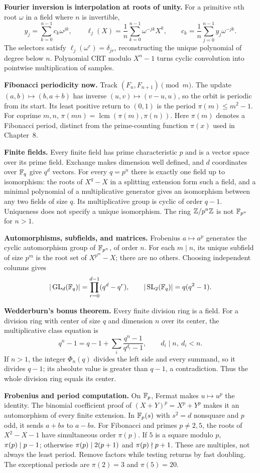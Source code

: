 \textbf{Fourier inversion is interpolation at roots of unity.}
For a primitive $n$th root $\omega$ in a field where $n$ is invertible,
\[
 y_j=\sum_{k=0}^{n-1}c_k\omega^{jk},\qquad
 \ell_j(X)=\frac1n\sum_{k=0}^{n-1}\omega^{-jk}X^k,\qquad
 c_k=\frac1n\sum_{j=0}^{n-1}y_j\omega^{-jk}.
\]
The selectors satisfy $\ell_j(\omega^r)=\delta_{jr}$, reconstructing
the unique polynomial of degree below $n$. Polynomial CRT modulo
$X^n-1$ turns cyclic convolution into pointwise multiplication of samples.

\textbf{Fibonacci periodicity now.} Track $(F_n,F_{n+1})\pmod m$.
The update $(a,b)\mapsto(b,a+b)$ has inverse $(u,v)\mapsto(v-u,u)$,
so the orbit is periodic from its start. Its least positive return to
$(0,1)$ is the period $\pi(m)\le m^2-1$.
For coprime $m,n$, $\pi(mn)=\operatorname{lcm}(\pi(m),\pi(n))$.
Here $\pi(m)$ denotes a Fibonacci period, distinct from the
prime-counting function $\pi(x)$ used in Chapter~8.

\textbf{Finite fields.} Every finite field has prime characteristic $p$
and is a vector space over its prime field. Exchange makes dimension
well defined, and $d$ coordinates over $\mathbb F_q$ give $q^d$ vectors.
For every $q=p^n$ there is exactly one field up to isomorphism:
the roots of $X^q-X$ in a splitting extension form such a field,
and a minimal polynomial of a multiplicative generator gives an
isomorphism between any two fields of size $q$. Its multiplicative
group is cyclic of order $q-1$. Uniqueness does not specify a unique
isomorphism. The ring $\mathbb Z/p^n\mathbb Z$ is not $\mathbb F_{p^n}$ for $n>1$.

\textbf{Automorphisms, subfields, and matrices.} Frobenius $a\mapsto a^p$
generates the cyclic automorphism group of $\mathbb F_{p^n}$, of order $n$.
For each $m\mid n$, its unique subfield of size $p^m$ is the root set
of $X^{p^m}-X$; there are no others. Choosing independent columns gives
\[
|\operatorname{GL}_d(\mathbb F_q)|=\prod_{r=0}^{d-1}(q^d-q^r),\qquad
|\operatorname{SL}_2(\mathbb F_q)|=q(q^2-1).
\]

\textbf{Wedderburn's bonus theorem.} Every finite division ring is a
field. For a division ring with center of size $q$ and dimension $n$
over its center, the multiplicative class equation is
\[
q^n-1=q-1+\sum_i\frac{q^n-1}{q^{d_i}-1},\qquad d_i\mid n,\ d_i<n.
\]
If $n>1$, the integer $\Phi_n(q)$ divides the left side and every
summand, so it divides $q-1$; its absolute value is greater than $q-1$,
a contradiction. Thus the whole division ring equals its center.

\textbf{Frobenius and period computation.} On $\mathbb F_p$, Fermat
makes $u\mapsto u^p$ the identity. The binomial coefficient proof of
$(X+Y)^p=X^p+Y^p$ makes it an automorphism of every finite extension.
In $\mathbb F_p(s)$ with $s^2=d$ nonsquare and $p$ odd, it sends $a+bs$ to
$a-bs$. For Fibonacci and primes $p\ne2,5$, the roots of $X^2-X-1$
have simultaneous order $\pi(p)$. If $5$ is a square modulo $p$,
$\pi(p)\mid p-1$; otherwise $\pi(p)\mid2(p+1)$ and
$\pi(p)\nmid p+1$. These are multiples, not always the least
period. Remove factors while testing returns by fast doubling.
The exceptional periods are $\pi(2)=3$ and $\pi(5)=20$.


